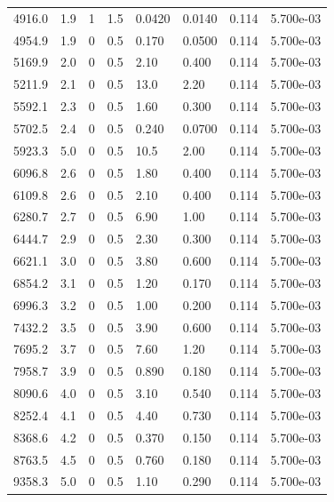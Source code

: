 \documentclass[preview]{standalone}
\begin{document}
{{{\begin{tabular}{L{1.2cm}C{1.2cm} C{0.3cm}C{0.5cm} C{1.4cm}C{1.4cm} C{1.4cm}C{1.4cm}}
  4916.0  &   1.9  & 1     & 1.5 &  0.0420  & 0.0140  & 0.114 &  5.700e-03   \\ 
  4954.9  &   1.9  & 0     & 0.5 &  0.170  & 0.0500  & 0.114 &  5.700e-03   \\ 
  5169.9  &   2.0  & 0     & 0.5 &  2.10  & 0.400  & 0.114 &  5.700e-03   \\ 
  5211.9  &   2.1  & 0     & 0.5 &  13.0  & 2.20  & 0.114 &  5.700e-03   \\ 
  5592.1  &   2.3  & 0     & 0.5 &  1.60  & 0.300  & 0.114 &  5.700e-03   \\ 
  5702.5  &   2.4  & 0     & 0.5 &  0.240  & 0.0700  & 0.114 &  5.700e-03   \\ 
  5923.3  &   5.0  & 0     & 0.5 &  10.5  & 2.00  & 0.114 &  5.700e-03   \\ 
  6096.8  &   2.6  & 0     & 0.5 &  1.80  & 0.400  & 0.114 &  5.700e-03   \\ 
  6109.8  &   2.6  & 0     & 0.5 &  2.10  & 0.400  & 0.114 &  5.700e-03   \\ 
  6280.7  &   2.7  & 0     & 0.5 &  6.90  & 1.00  & 0.114 &  5.700e-03   \\ 
  6444.7  &   2.9  & 0     & 0.5 &  2.30  & 0.300  & 0.114 &  5.700e-03   \\ 
  6621.1  &   3.0  & 0     & 0.5 &  3.80  & 0.600  & 0.114 &  5.700e-03   \\ 
  6854.2  &   3.1  & 0     & 0.5 &  1.20  & 0.170  & 0.114 &  5.700e-03   \\ 
  6996.3  &   3.2  & 0     & 0.5 &  1.00  & 0.200  & 0.114 &  5.700e-03   \\ 
  7432.2  &   3.5  & 0     & 0.5 &  3.90  & 0.600  & 0.114 &  5.700e-03   \\ 
  7695.2  &   3.7  & 0     & 0.5 &  7.60  & 1.20  & 0.114 &  5.700e-03   \\ 
  7958.7  &   3.9  & 0     & 0.5 &  0.890  & 0.180  & 0.114 &  5.700e-03   \\ 
  8090.6  &   4.0  & 0     & 0.5 &  3.10  & 0.540  & 0.114 &  5.700e-03   \\ 
  8252.4  &   4.1  & 0     & 0.5 &  4.40  & 0.730  & 0.114 &  5.700e-03   \\ 
  8368.6  &   4.2  & 0     & 0.5 &  0.370  & 0.150  & 0.114 &  5.700e-03   \\ 
  8763.5  &   4.5  & 0     & 0.5 &  0.760  & 0.180  & 0.114 &  5.700e-03   \\ 
  9358.3  &   5.0  & 0     & 0.5 &  1.10  & 0.290  & 0.114 &  5.700e-03   \\ 

\end{tabular}}}}
\end{document}
